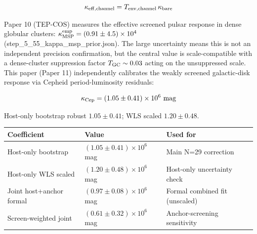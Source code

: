 \documentclass[
]{article}
\newcounter{none} %
\begin{document}
\begin{equation}
\kappa_{\rm eff,channel} = T_{\rm env,channel} \, \kappa_{\rm bare}
\end{equation}

Paper 10 (TEP-COS) measures the effective screened pulsar response in
dense globular clusters:
\(\kappa_{\rm MSP}^{\rm emp} = (0.91 \pm 4.5) \times 10^4\)
(step\_5\_55\_kappa\_msp\_prior.json). The large uncertainty means this
is not an independent precision confirmation, but the central value is
scale-compatible with a dense-cluster suppression factor
\(T_{\rm GC} \sim 0.03\) acting on the unsuppressed scale. This paper
(Paper 11) independently calibrates the weakly screened galactic-disk
response via Cepheid period-luminosity residuals:

\begin{equation}
\kappa_{\rm Cep} = (1.05 \pm 0.41) \times 10^6 \text{ mag}
\label{eq:kappa_cep_result}
\end{equation}

Host-only bootstrap robust \(1.05 \pm 0.41\); WLS scaled
\(1.20 \pm 0.48\).

{\def\LTcaptype{none} %
\begin{longtable}[]{@{}
  >{\raggedright\arraybackslash}p{}
  >{\raggedright\arraybackslash}p{}
  >{\raggedright\arraybackslash}p{}@{}}
\toprule\noalign{}
\begin{minipage}[b]{\linewidth}\raggedright
Coefficient
\end{minipage} & \begin{minipage}[b]{\linewidth}\raggedright
Value
\end{minipage} & \begin{minipage}[b]{\linewidth}\raggedright
Used for
\end{minipage} \\
\midrule\noalign{}
\endhead
\bottomrule\noalign{}
\endlastfoot
Host-only bootstrap & \((1.05 \pm 0.41) \times 10^6\) mag & Main N=29
correction \\
Host-only WLS scaled & \((1.20 \pm 0.48) \times 10^6\) mag & Host-only
uncertainty check \\
Joint host+anchor formal & \((0.97 \pm 0.08) \times 10^6\) mag & Formal
combined fit (unscaled) \\
Screen-weighted joint & \((0.61 \pm 0.32) \times 10^6\) mag &
Anchor-screening sensitivity \\
\end{longtable}
}
\end{document}
